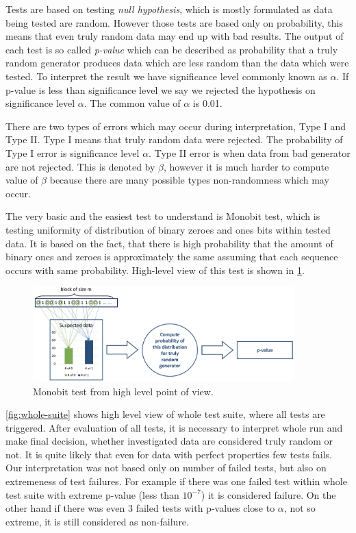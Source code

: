 \documentclass[
    digital,    %
    oneside,    %
    color,
    11pt,
    nocover,
    notable,
    nolof,
    nolot,
    final
]{fithesis3}
\begin{document}
Tests are based on testing \textit{null hypothesis}, which is mostly formulated as data being tested are random. However those tests are based only on probability, this means that even truly random data may end up with bad results. The output of each test is so called \textit{p-value} which can be described as probability that a truly random generator produces data which are less random than the data which were tested. To interpret the result we have significance level commonly known as $\alpha$. If p-value is less than significance level we say we rejected the hypothesis on significance level $\alpha$. The common value of $\alpha$ is 0.01. \cite{nist-explanation}

There are two types of errors which may occur during interpretation, Type I and Type II. Type I means that truly random data were rejected. The probability of Type I error is significance level $\alpha$. Type II error is when data from bad generator are not rejected. This is denoted by $\beta$, however it is much harder to compute value of $\beta$ because there are many possible types non-randomness which may occur. \cite{nist-explanation}

The very basic and the easiest test to understand is Monobit test, which is testing uniformity of distribution of binary zeroes and ones bits within tested data. It is based on the fact, that there is high probability that the amount of binary ones and zeroes is approximately the same assuming that each sequence occurs with same probability. High-level view of this test is shown in \cref{fig:monobit}. 

\begin{figure}[h]
	\centering
	\includegraphics[width=0.9\textwidth]{./images/pictures/monobit-high-level.png}
	\caption{Monobit test from high level point of view.}
	\label{fig:monobit}
\end{figure}

\cref{fig:whole-suite} shows high level view of whole test suite, where all tests are triggered. After evaluation of all tests, it is necessary to interpret whole run and make final decision, whether investigated data are considered truly random or not. It is quite likely that even for data with perfect properties few tests fails. Our interpretation was not based only on number of failed tests, but also on  extremeness of test failures. For example if there was one failed test within whole test suite with extreme p-value (less than $10^{-7}$) it is considered failure. On the other hand if there was even 3 failed tests with p-values close to $\alpha$, not so extreme, it is still considered as non-failure.
\end{document}
